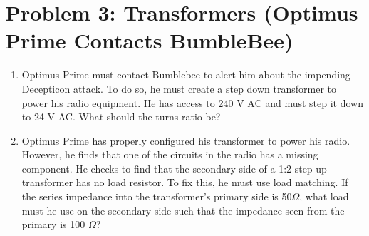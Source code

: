 \documentclass{article}
\begin{document}
\section*{Problem 3: Transformers (Optimus Prime Contacts BumbleBee)}
\begin{enumerate}[label=(\alph*)]
    \item {Optimus Prime must contact Bumblebee to alert him about the impending Decepticon attack. To do so, he must create a step down transformer to power his radio equipment. He has access to 240 V AC and must step it down to 24 V AC. What should the turns ratio be?}
    \item {Optimus Prime has properly configured his transformer to power his radio. However, he finds that one of the circuits in the radio has a missing component. He checks to find that the secondary side of a 1:2 step up transformer has no load resistor. To fix this, he must use load matching. If the series impedance into the transformer's primary side is 50$\Omega$, what load must he use on the secondary side such that the impedance seen from the primary is 100 $\Omega$?}
\end{enumerate}
\newpage %
\noindent 
\end{document}
